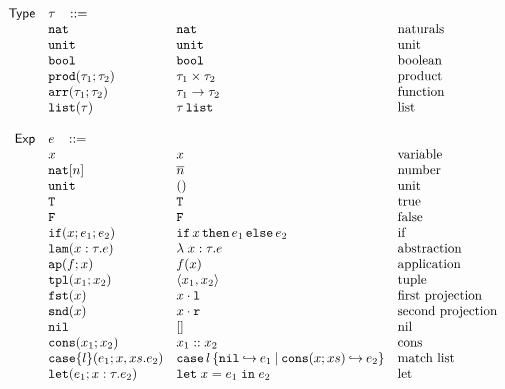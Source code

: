 \documentclass[11pt]{article}
\newcommand{\ms}[1]{\ensuremath{\mathsf{#1}}}
\newcommand{\irl}[1]{\mathtt{#1}}
\begin{document}
\[
\begin{array}{r l l l l}
\ms{Type} & \tau \,\,\,\,\, ::= \\
	& \irl{nat}                	 			& \irl{nat}											& \text{naturals}\\
	& \unittyabt                	 			& \unittycst										& \text{unit}\\
  & \booltyabt                       & \booltycst                    & \text{boolean}\\
  & \prodtyabt{\tau_1}{\tau_2}       & \prodtycst{\tau_1}{\tau_2}    & \text{product}\\
	&\irl{arr}(\tau_1;\tau_2) 				& \arrtycst{\tau_1}{\tau_2} 									& \text{function}\\
  &\listtyabt{\tau}		& \listtycst{\tau}											& \text{list}\\
	 \\
\ms{Exp}
        & e   \,\,\,\,\, ::= \\
 	& x                                			& x 												& \text{variable}\\
  & \irl{nat}[n]							& \numeral{n}												& \text{number}\\
  & \irl{unit}							& ()												& \text{unit}\\
  & \irl{T}							& \irl{T}												& \text{true}\\
  & \irl{F}	   					& \irl{F}												& \text{false}\\
  & \ifexabt{x}{e_1}{e_2} & \ifexcst{x}{e_1}{e_2}  & \text{if}\\
  & \irl{lam}(x:\tau.e) 						&\lambda \; x : \tau. e 		& \text{abstraction}\\
  & \irl{ap}(f;x) 					& \appcst{f}{x} 										& \text{application}\\
  & \irl{tpl}(x_1;x_2)     	& \pairexcst{x_1}{x_2}                									& \text{tuple}\\
 	& \irl{fst}(x)					& \fstexcst{x}   										& \text{first projection}\\
 	& \irl{snd}(x)					& \sndexcst{x}   										& \text{second projection}\\
 	& \nilexabt					& []   										& \text{nil}\\
 	& \consexabt{x_1}{x_2}					& x_1::x_2   										& \text{cons}\\
 	& \listcaseexabt{l}{e_1}{x}{xs}{e_2}					& \listcaseexcst{l}{e_1}{x}{xs}{e_2}   	& \text{match list}\\
  & \irl{let}(e_1; x : \tau.e_2)			& \irl{let}\; x = e_1 \; \irl{in}\; e_2   	& \text{let}\\

\end{array}\]
\end{document}
